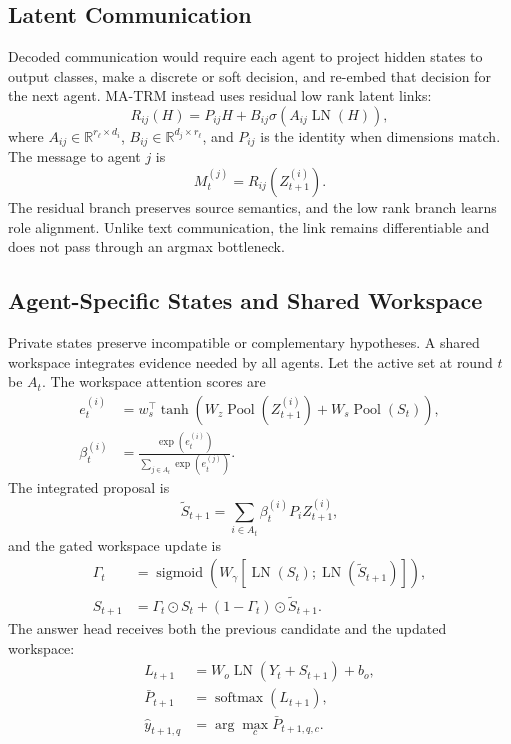 \documentclass[10pt,a4paper,twocolumn]{article}
\newcommand{\R}{\mathbb{R}}
\newcommand{\softmax}{\operatorname{softmax}}
\newcommand{\sigmoid}{\operatorname{sigmoid}}
\newcommand{\Pool}{\operatorname{Pool}}
\newcommand{\LN}{\operatorname{LN}}
\newcommand{\MA}{\textsc{MA-TRM}}
\begin{document}
\subsection{Latent Communication}
Decoded communication would require each agent to project hidden states to output classes, make a discrete or soft decision, and re-embed that decision for the next agent. \MA{} instead uses residual low rank latent links:
\begin{equation}
R_{ij}(H)=P_{ij}H+B_{ij}\sigma\!\left(A_{ij}\LN(H)\right), \label{eq:latent_link}
\end{equation}
where $A_{ij}\in\R^{r_\ell\times d_i}$, $B_{ij}\in\R^{d_j\times r_\ell}$, and $P_{ij}$ is the identity when dimensions match. The message to agent $j$ is
\begin{equation}
M_t^{(j)}=R_{ij}\!\left(Z_{t+1}^{(i)}\right). \label{eq:message}
\end{equation}
The residual branch preserves source semantics, and the low rank branch learns role alignment. Unlike text communication, the link remains differentiable and does not pass through an argmax bottleneck.

\subsection{Agent-Specific States and Shared Workspace}
Private states preserve incompatible or complementary hypotheses. A shared workspace integrates evidence needed by all agents. Let the active set at round $t$ be $A_t$. The workspace attention scores are
\begin{align}
e_t^{(i)} &= w_s^\top\tanh\!\left(W_z\Pool(Z_{t+1}^{(i)})+W_s\Pool(S_t)\right),\\
\beta_t^{(i)} &= \frac{\exp(e_t^{(i)})}{\sum_{j\in A_t}\exp(e_t^{(j)})}. \label{eq:workspace_weights}
\end{align}
The integrated proposal is
\begin{equation}
\widetilde S_{t+1}=\sum_{i\in A_t}\beta_t^{(i)}P_iZ_{t+1}^{(i)}, \label{eq:workspace_proposal}
\end{equation}
and the gated workspace update is
\begin{align}
\Gamma_t &= \sigmoid\!\left(W_\gamma[\LN(S_t);\LN(\widetilde S_{t+1})]\right),\\
S_{t+1} &= \Gamma_t\odot S_t+(1-\Gamma_t)\odot\widetilde S_{t+1}. \label{eq:workspace_update}
\end{align}
The answer head receives both the previous candidate and the updated workspace:
\begin{align}
L_{t+1} &= W_o\LN(Y_t+S_{t+1})+b_o,\\
\bar P_{t+1} &= \softmax(L_{t+1}),\\
\hat y_{t+1,q} &= \arg\max_{c}\bar P_{t+1,q,c}. \label{eq:answer_update}
\end{align}
\end{document}
